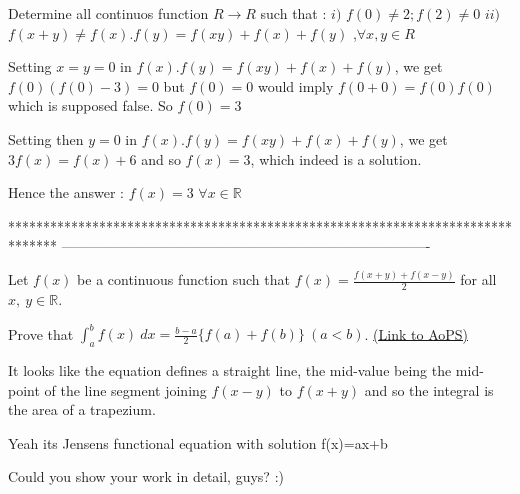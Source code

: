 \begin{solution}
	\begin{tcolorbox}Determine all continuos function $ R\to R$ such that :
$ i)$ $ f(0) \ne 2;f(2) \ne 0$
$ ii)$ $ f(x + y) \ne f(x).f(y) = f(xy) + f(x) + f(y)$ ,$ \forall x,y \in R$\end{tcolorbox}

Setting $ x=y=0$ in $ f(x).f(y) = f(xy) + f(x) + f(y)$, we get $ f(0)(f(0)-3)=0$ but $ f(0)=0$ would imply $ f(0+0)=f(0)f(0)$ which is supposed false. So $ f(0)=3$

Setting then $ y=0$ in $ f(x).f(y) = f(xy) + f(x) + f(y)$, we get $ 3f(x)=f(x)+6$ and so $ f(x)=3$, which indeed is a solution.

Hence the answer : $ \boxed{f(x)=3}$ $ \forall x\in\mathbb R$
\end{solution}
*******************************************************************************
-------------------------------------------------------------------------------

\begin{problem}
	Let $ f(x)$ be a continuous function such that $ f(x) = \frac {f(x + y) + f(x - y)}{2}$ for all $ x,\ y\in\mathbb{R}$. 

Prove that $ \int_a^b f(x)\ dx = \frac {b - a}{2}\{f(a) + f(b)\}\ (a < b)$.
	\flushright \href{https://artofproblemsolving.com/community/c7h321469}{(Link to AoPS)}
\end{problem}



\begin{solution}
	It looks like the equation defines a straight line, the mid-value being the mid-point of the line segment joining $ f(x-y)$ to $ f(x+y)$ and so the integral is the area of a trapezium.
\end{solution}



\begin{solution}
	Yeah its Jensens functional equation with solution f(x)=ax+b
\end{solution}



\begin{solution}
	Could you show your work in detail, guys? :)
\end{solution}



